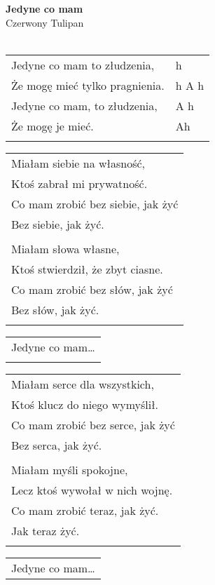 \documentclass[a5paper]{article}
\begin{document}


\noindent
\fontsize{12pt}{15pt}\selectfont
\textbf{Jedyne co mam} \\
\fontsize{8pt}{10pt}\selectfont
Czerwony Tulipan \\ \\
\fontsize{10pt}{12pt}\selectfont

\begin{tabular}{@{}p{6.50cm}p{3cm}@{}}
\noindent
Jedyne co mam to złudzenia, & h \\
Że mogę mieć tylko pragnienia. & h A h \\
Jedyne co mam, to złudzenia, & A h \\
Że mogę je mieć. & Ah \\ \\
\end{tabular}

\noindent
\begin{tabular}{@{}p{7.50cm}@{}}
Miałam siebie na własność, \\
Ktoś zabrał mi prywatność. \\
Co mam zrobić bez siebie, jak żyć \\
Bez siebie, jak żyć. \\ \\

Miałam słowa własne, \\
Ktoś stwierdził, że zbyt ciasne. \\
Co mam zrobić bez słów, jak żyć \\
Bez słów, jak żyć. \\ \\
\end{tabular}

\noindent
\begin{tabular}{@{}p{6.50cm}@{}}
Jedyne co mam… \\ \\
\end{tabular}

\noindent
\begin{tabular}{@{}p{7.50cm}@{}}
Miałam serce dla wszystkich, \\
Ktoś klucz do niego wymyślił. \\
Co mam zrobić bez serce, jak żyć \\
Bez serca, jak żyć. \\ \\

Miałam myśli spokojne, \\
Lecz ktoś wywołał w nich wojnę. \\
Co mam zrobić teraz, jak żyć. \\
Jak teraz żyć. \\ \\
\end{tabular}

\noindent
\begin{tabular}{@{}p{6.50cm}@{}}
Jedyne co mam…
\end{tabular}
\end{document}
